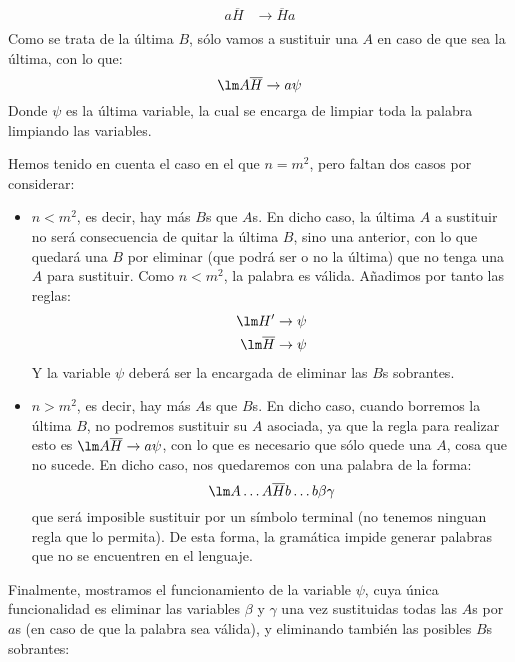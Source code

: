 \begin{ejercicio}
\begin{enumerate}
\begin{align*}
                a\overline{H} &\rightarrow \overline{H}a \\
            \end{align*}
            Como se trata de la última $B$, sólo vamos a sustituir una $A$ en caso de que sea la última, con lo que:
            \begin{equation*}
                \lm A\overline{H} \rightarrow a\psi
            \end{equation*}
            Donde $\psi$ es la última variable, la cual se encarga de limpiar toda la palabra limpiando las variables.

            Hemos tenido en cuenta el caso en el que $n=m^2$, pero faltan dos casos por considerar:
            \begin{itemize}
                \item $n<m^2$, es decir, hay más $B$s que $A$s. En dicho caso, la última $A$ a sustituir no será consecuencia de quitar la última $B$, sino una anterior, con lo que quedará una $B$ por eliminar (que podrá ser o no la última) que no tenga una $A$ para sustituir. Como $n<m^2$, la palabra es válida. Añadimos por tanto las reglas:
                    \begin{align*}
                        \lm H' &\rightarrow \psi \\
                        \lm \overline{H} &\rightarrow \psi \\
                    \end{align*}
                    Y la variable $\psi$ deberá ser la encargada de eliminar las $B$s sobrantes.
                \item $n>m^2$, es decir, hay más $A$s que $B$s. En dicho caso, cuando borremos la última $B$, no podremos sustituir su $A$ asociada, ya que la regla para realizar esto es $\lm A\overline{H}\rightarrow a\psi$, con lo que es necesario que sólo quede una $A$, cosa que no sucede. En dicho caso, nos quedaremos con una palabra de la forma:
                    \begin{equation*}
                        \lm A\ldots A\overline{H} b\ldots b\beta\gamma
                    \end{equation*}
                    que será imposible sustituir por un símbolo terminal (no tenemos ninguan regla que lo permita). De esta forma, la gramática impide generar palabras que no se encuentren en el lenguaje.
            \end{itemize}
            Finalmente, mostramos el funcionamiento de la variable $\psi$, cuya única funcionalidad es eliminar las variables $\beta$ y $\gamma$ una vez sustituidas todas las $A$s por $a$s (en caso de que la palabra sea válida), y eliminando también las posibles $B$s sobrantes:

\end{enumerate}
\end{ejercicio}
